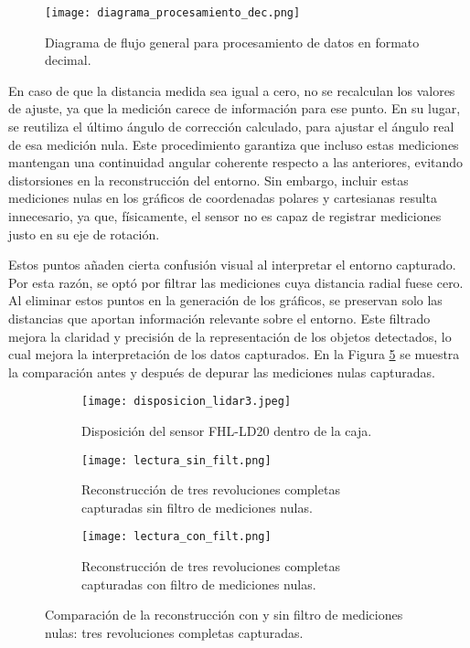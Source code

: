 \begin{figure}[H]
	\centering
	\texttt{[image: diagrama\_procesamiento\_dec.png]}
	\caption{Diagrama de flujo general para procesamiento de datos en formato decimal.}
	\label{fig:diagrama_procesamiento_dec}
\end{figure}

En caso de que la distancia medida sea igual a cero, no se recalculan los valores de ajuste, ya que la medición carece de información para ese punto. En su lugar, se reutiliza el último ángulo de corrección calculado, para ajustar el ángulo real de esa medición nula. Este procedimiento garantiza que incluso estas mediciones mantengan una continuidad angular coherente respecto a las anteriores, evitando distorsiones en la reconstrucción del entorno. Sin embargo, incluir estas mediciones nulas en los gráficos de coordenadas polares y cartesianas resulta innecesario, ya que, físicamente, el sensor no es capaz de registrar mediciones justo en su eje de rotación. 

Estos puntos añaden cierta confusión visual al interpretar el entorno capturado. Por esta razón, se optó por filtrar las mediciones cuya distancia radial fuese cero. Al eliminar estos puntos en la generación de los gráficos, se preservan solo las distancias que aportan información relevante sobre el entorno. Este filtrado mejora la claridad y precisión de la representación de los objetos detectados, lo cual mejora la interpretación de los datos capturados. En la Figura \ref{fig: comparación_con_sin_filt} se muestra la comparación antes y después de depurar las mediciones nulas capturadas.

\begin{figure}[H]
	\centering
	\begin{subfigure}{0.6\textwidth}
		\centering
		\texttt{[image: disposicion\_lidar3.jpeg]}
		\caption{Disposición del sensor FHL-LD20 dentro de la caja.}
		\label{disposicion_lidar3}
		\vspace{1em}
	\end{subfigure}
	\begin{subfigure}{0.45\textwidth}
		\centering
		\texttt{[image: lectura\_sin\_filt.png]}
		\caption{Reconstrucción de tres revoluciones completas capturadas sin filtro de mediciones nulas.}
		\label{lectura_sin_filt}
	\end{subfigure}
	\hspace{1em}
	\begin{subfigure}{0.45\textwidth}
		\centering
		\texttt{[image: lectura\_con\_filt.png]}
		\caption{Reconstrucción de tres revoluciones completas capturadas con filtro de mediciones nulas.}
		\label{lectura_con_filt}
	\end{subfigure}
	\caption{Comparación de la reconstrucción con y sin filtro de mediciones nulas: tres revoluciones completas capturadas.}
	\label{fig: comparación_con_sin_filt}
\end{figure}

